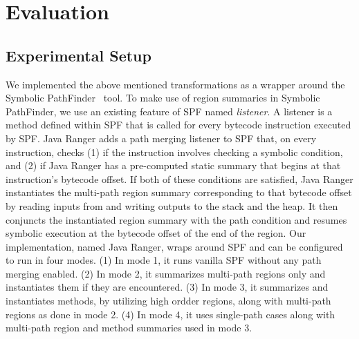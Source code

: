 \section{Evaluation}
\label{sec:results}
\subsection{Experimental Setup}
We implemented the above mentioned transformations as a wrapper around the Symbolic PathFinder~\cite{spf} tool.
%
To make use of region summaries in Symbolic PathFinder, we use an existing feature of SPF named \textit{listener}.
%
A listener is a method defined within SPF that is called for every bytecode instruction executed by SPF.
%
Java Ranger adds a path merging listener to SPF that, on every instruction, checks (1) if the instruction involves
checking a symbolic condition, and (2) if Java Ranger has a pre-computed static summary that begins at that
instruction\rq s bytecode offset.
%
If both of these conditions are satisfied, Java Ranger instantiates the multi-path region summary corresponding to that
bytecode offset by reading inputs from and writing outputs to the stack and the heap.
%
It then conjuncts the instantiated region summary with the path condition and resumes symbolic execution at the
bytecode offset of the end of the region.
%
Our implementation, named Java Ranger, wraps around SPF and can be configured to run in four modes.
%
(1) In mode 1, it runs vanilla SPF without any path merging enabled.
%
(2) In mode 2, it summarizes multi-path regions only and instantiates them if they are encountered.
%
(3) In mode 3, it summarizes and instantiates methods, by utilizing high ordder regions, along with multi-path regions
as done in mode 2.
%
(4) In mode 4, it uses single-path cases along with multi-path region and method summaries used in mode 3.
%
